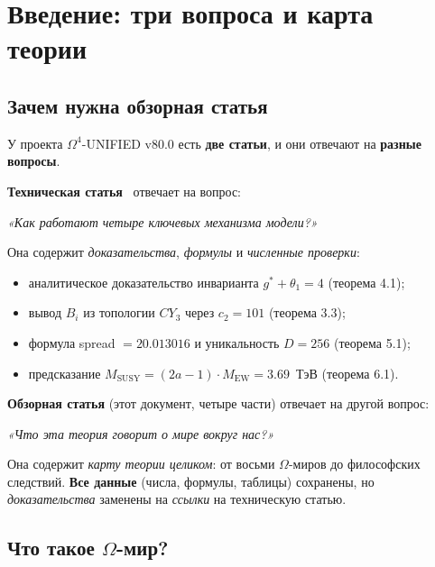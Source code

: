 \documentclass[11pt,a4paper]{article}
\newcommand{\CY}{CY_3}
\newcommand{\Om}{\Omega^4}
\newcommand{\MEW}{M_{\text{EW}}}
\newcommand{\MSUSY}{M_{\text{SUSY}}}
\theoremstyle{definition}
\begin{document}
\vspace{1cm}
\newpage
\tableofcontents
\newpage

\section{Введение: три вопроса и карта теории}
\label{sec:intro}

\subsection{Зачем нужна обзорная статья}

У проекта $\Om$-UNIFIED v80.0 есть \textbf{две статьи}, и они 
отвечают на \textbf{разные вопросы}.

\medskip\noindent
\textbf{Техническая статья}~\cite{matershov_omega4_2026}
отвечает на вопрос:
\begin{center}
\emph{«Как работают четыре ключевых механизма модели?»}
\end{center}
Она содержит \emph{доказательства}, \emph{формулы} и 
\emph{численные проверки}:
\begin{itemize}
    \item аналитическое доказательство инварианта 
          $g^* + \theta_1 = 4$ (теорема 4.1);
    \item вывод $B_i$ из топологии $\CY$ через 
          $c_2 = 101$ (теорема 3.3);
    \item формула spread $= 20.013016$ и уникальность 
          $D = 256$ (теорема 5.1);
    \item предсказание $\MSUSY = (2a-1) \cdot \MEW = 3.69$~ТэВ 
          (теорема 6.1).
\end{itemize}

\medskip\noindent
\textbf{Обзорная статья} (этот документ, четыре части) 
отвечает на другой вопрос:
\begin{center}
\emph{«Что эта теория говорит о мире вокруг нас?»}
\end{center}
Она содержит \emph{карту теории целиком}: от восьми 
$\Omega$-миров до философских следствий. \textbf{Все данные} 
(числа, формулы, таблицы) сохранены, но \emph{доказательства} 
заменены на \emph{ссылки} на техническую статью.

\subsection{Что такое $\Omega$-мир?}
\end{document}
